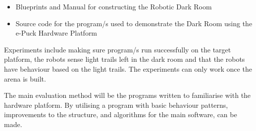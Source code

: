 \begin{itemize}
\item Blueprints and Manual for constructing the Robotic Dark Room
\item Source code for the program/s used to demonstrate the Dark Room using the
      e-Puck Hardware Platform
\end{itemize}

Experiments include making sure program/s run successfully on the target
platform, the robots sense light trails left in the dark room and that the
robots have behaviour based on the light trails.  The experiments can only work
once the arena is built.

The main evaluation method will be the programs written to familiarise with the
hardware platform.  By utilising a program with basic behaviour patterns, 
improvements to the structure, and algorithms for the main software, can be 
made.